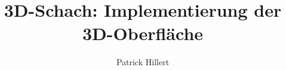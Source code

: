 \documentclass{../3dchess}
\title{3D-Schach: Implementierung der 3D-Oberfläche}
\author{Patrick Hillert}
\begin{document}
  \maketitle  
  
  \tableofcontents
    
  
  
  
  
    
  \appendix
  
  
  \nocite{*}
\end{document}
